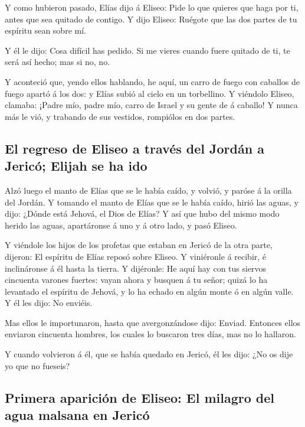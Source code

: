  Y como hubieron pasado, Elías dijo á Eliseo: Pide lo que
quieres que haga por ti, antes que sea quitado de contigo. Y dijo
Eliseo: Ruégote que las dos partes de tu espíritu sean sobre mí.

 Y él le dijo: Cosa difícil has pedido. Si me vieres cuando
fuere quitado de ti, te será así hecho; mas si no, no.

 Y aconteció que, yendo ellos hablando, he aquí, un carro
de fuego con caballos de fuego apartó á los dos: y Elías subió al cielo
en un torbellino.  Y viéndolo Eliseo, clamaba: ¡Padre mío,
padre mío, carro de Israel y su gente de á caballo! Y nunca más le vió,
y trabando de sus vestidos, rompiólos en dos partes.

\hypertarget{el-regreso-de-eliseo-a-travuxe9s-del-jorduxe1n-a-jericuxf3-elijah-se-ha-ido}{%
\subsection{El regreso de Eliseo a través del Jordán a Jericó; Elijah se
ha
ido}\label{el-regreso-de-eliseo-a-travuxe9s-del-jorduxe1n-a-jericuxf3-elijah-se-ha-ido}}

 Alzó luego el manto de Elías que se le había caído, y
volvió, y paróse á la orilla del Jordán.  Y tomando el
manto de Elías que se le había caído, hirió las aguas, y dijo: ¿Dónde
está Jehová, el Dios de Elías? Y así que hubo del mismo modo herido las
aguas, apartáronse á uno y á otro lado, y pasó Eliseo.

 Y viéndole los hijos de los profetas que estaban en Jericó
de la otra parte, dijeron: El espíritu de Elías reposó sobre Eliseo. Y
viniéronle á recibir, é inclináronse á él hasta la tierra. 
Y dijéronle: He aquí hay con tus siervos cincuenta varones fuertes:
vayan ahora y busquen á tu señor; quizá lo ha levantado el espíritu de
Jehová, y lo ha echado en algún monte ó en algún valle. Y él les dijo:
No enviéis.

 Mas ellos le importunaron, hasta que avergonzándose dijo:
Enviad. Entonces ellos enviaron cincuenta hombres, los cuales lo
buscaron tres días, mas no lo hallaron.

 Y cuando volvieron á él, que se había quedado en Jericó,
él les dijo: ¿No os dije yo que no fueseis?

\hypertarget{primera-apariciuxf3n-de-eliseo-el-milagro-del-agua-malsana-en-jericuxf3}{%
\subsection{Primera aparición de Eliseo: El milagro del agua malsana en
Jericó}\label{primera-apariciuxf3n-de-eliseo-el-milagro-del-agua-malsana-en-jericuxf3}}

